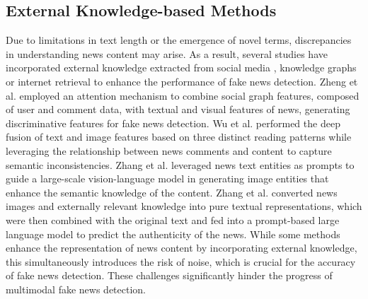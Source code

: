\subsection{External Knowledge-based Methods}
Due to limitations in text length or the emergence of novel terms, discrepancies in understanding news content may arise. As a result, several studies have incorporated external knowledge extracted from social media \cite{zhang2021mining}, knowledge graphs \cite{zhang2019multi,dun2021kan} or internet retrieval \cite{zhang2024escnet,qi2024sniffer} to enhance the performance of fake news detection. Zheng et al. \cite{zheng2022mfan} employed an attention mechanism to combine social graph features, composed of user and comment data, with textual and visual features of news, generating discriminative features for fake news detection. Wu et al. \cite{wu2023see} performed the deep fusion of text and image features based on three distinct reading patterns while leveraging the relationship between news comments and content to capture semantic inconsistencies. Zhang et al. \cite{zhang2023hierarchical} leveraged news text entities as prompts to guide a large-scale vision-language model in generating image entities that enhance the semantic knowledge of the content. Zhang et al. \cite{zhangnatural} converted news images and externally relevant knowledge into pure textual representations, which were then combined with the original text and fed into a prompt-based large language model to predict the authenticity of the news. While some methods enhance the representation of news content by incorporating external knowledge, this simultaneously introduces the risk of noise, which is crucial for the accuracy of fake news detection. These challenges significantly hinder the progress of multimodal fake news detection.



    
%